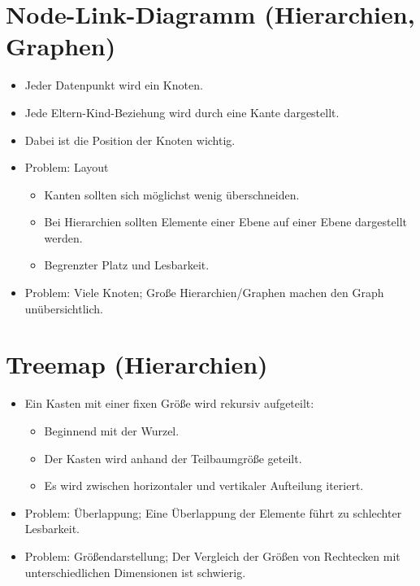 	\section{Node-Link-Diagramm (Hierarchien, Graphen)}
		\begin{itemize}
			\item Jeder Datenpunkt wird ein Knoten.
			\item Jede Eltern-Kind-Beziehung wird durch eine Kante dargestellt.
			\item Dabei ist die Position der Knoten wichtig.
			\item Problem: Layout
				\begin{itemize}
					\item Kanten sollten sich möglichst wenig überschneiden.
					\item Bei Hierarchien sollten Elemente einer Ebene auf einer Ebene dargestellt werden.
					\item Begrenzter Platz und Lesbarkeit.
				\end{itemize}
			\item Problem: Viele Knoten; Große Hierarchien/Graphen machen den Graph unübersichtlich.
		\end{itemize}

	\section{Treemap (Hierarchien)}
		\begin{itemize}
			\item Ein Kasten mit einer fixen Größe wird rekursiv aufgeteilt:
				\begin{itemize}
					\item Beginnend mit der Wurzel.
					\item Der Kasten wird anhand der Teilbaumgröße geteilt.
					\item Es wird zwischen horizontaler und vertikaler Aufteilung iteriert.
				\end{itemize}
			\item Problem: Überlappung; Eine Überlappung der Elemente führt zu schlechter Lesbarkeit.
			\item Problem: Größendarstellung; Der Vergleich der Größen von Rechtecken mit unterschiedlichen Dimensionen ist schwierig.
		\end{itemize}

